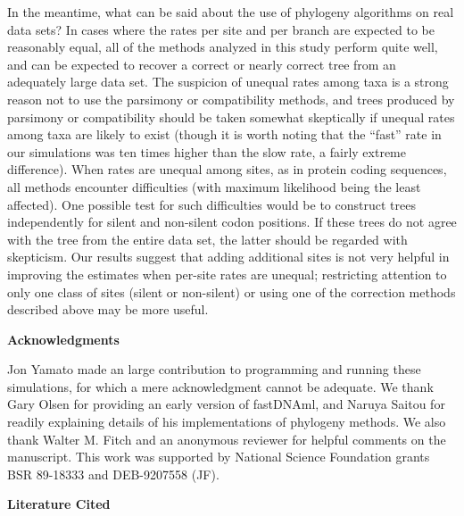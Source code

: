 In the meantime, what can be said about the use of phylogeny algorithms
on real data sets?  In cases where the rates per site and per branch are
expected to be reasonably equal, all of the methods analyzed in this
study perform quite well, and can be expected to recover a correct or
nearly correct tree from an adequately large data set.  The suspicion of
unequal rates among taxa is a strong reason not to use the parsimony or
compatibility methods, and trees produced by parsimony or compatibility
should be taken somewhat skeptically if unequal rates among taxa are
likely to exist (though it is worth noting that the ``fast'' rate in our
simulations was ten times higher than the slow rate, a fairly extreme
difference).  When rates are unequal among sites, as in protein coding
sequences, all methods encounter difficulties (with maximum likelihood
being the least affected).  One possible test for such difficulties
would be to construct trees independently for silent and non-silent
codon positions.  If these trees do not agree with the tree from the
entire data set, the latter should be regarded with skepticism.
Our results suggest that adding additional sites is not
very helpful in improving the estimates when per-site rates are unequal;
restricting attention to only one class of sites (silent or
non-silent) or using one of the correction methods described above may
be more useful.

\bigskip

\bigskip

\noindent
{\bf Acknowledgments}

Jon Yamato made an large contribution to programming and running these
simulations, for which a mere acknowledgment cannot be adequate.
We thank Gary Olsen for providing an early version of fastDNAml,
and Naruya Saitou for readily explaining details of his implementations
of phylogeny methods.  We also thank Walter M. Fitch and an anonymous
reviewer for helpful comments on the manuscript.
This work was supported by National Science Foundation grants BSR 89-18333
and DEB-9207558 (JF).

\newpage

\noindent
{\bf Literature Cited}
\bigskip



